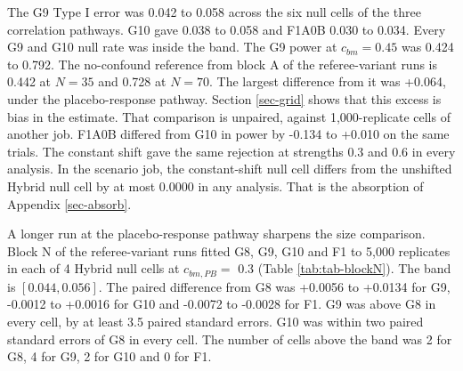 \documentclass[
  11pt,
]{article}
\begin{document}
The G9 Type I error was 0.042 to 0.058 across the six null cells
of the three correlation pathways. G10 gave 0.038 to 0.058 and
F1A0B 0.030 to 0.034. Every G9 and G10 null rate was inside the
band. The G9 power at \(c_{bm} = 0.45\) was 0.424 to 0.792. The
no-confound reference from block A of the referee-variant runs is
0.442 at \(N = 35\) and 0.728 at \(N = 70\). The
largest difference from it was +0.064, under the
placebo-response pathway. Section \ref{sec-grid} shows that this
excess is bias in the estimate. That comparison is
unpaired, against 1,000-replicate cells of another job. F1A0B
differed from G10 in power by -0.134 to +0.010 on the same trials.
The constant shift gave the same rejection at strengths 0.3 and 0.6
in every analysis. In the scenario job, the constant-shift null cell
differs from the unshifted Hybrid null cell by at most
0.0000 in any analysis. That is the absorption of Appendix
\ref{sec-absorb}.

A longer run at the placebo-response pathway sharpens the size
comparison. Block N of the referee-variant runs fitted G8, G9, G10
and F1 to 5,000 replicates in each of 4
Hybrid null cells at \(c_{bm,PB} =\) 0.3
(Table \ref{tab:tab-blockN}). The band is \([0.044, 0.056]\). The
paired difference from G8 was +0.0056 to +0.0134 for G9, -0.0012 to +0.0016
for G10 and -0.0072 to -0.0028 for F1. G9 was above G8 in every cell,
by at least 3.5 paired standard errors. G10 was within
two paired standard errors of G8 in every cell. The number of cells
above the band was 2 for G8, 4 for
G9, 2 for G10 and 0 for F1.
\end{document}

